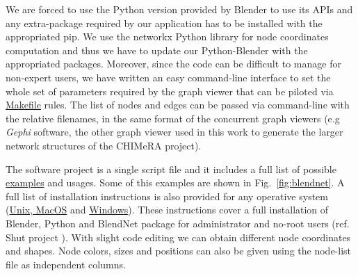 \documentclass{standalone}
\begin{document}
We are forced to use the \textsf{Python} version provided by \textsf{Blender} to use its APIs and any extra-package required by our application has to be installed with the appropriated \textsf{pip}.
We use the \textsf{networkx} \textsf{Python} library for node coordinates computation and thus we have to update our \textsf{Python}-\textsf{Blender} with the appropriated packages.
Moreover, since the code can be difficult to manage for non-expert users, we have written an easy command-line interface to set the whole set of parameters required by the graph viewer that can be piloted via \href{https://github.com/Nico-Curti/BlendNet/blob/master/Makefile}{\textsf{Makefile}} rules.
The list of nodes and edges can be passed via command-line with the relative filenames, in the same format of the concurrent graph viewers (e.g \emph{Gephi} software, the other graph viewer used in this work to generate the larger network structures of the \textsf{CHIMeRA} project).

The software project is a single script file and it includes a full list of possible \href{https://github.com/Nico-Curti/BlendNet/blob/master/example}{examples} and usages.
Some of this examples are shown in Fig.~\ref{fig:blendnet}.
A full list of installation instructions is also provided for any operative system (\href{https://github.com/Nico-Curti/BlendNet/blob/master/install.sh}{Unix, MacOS} and \href{https://github.com/Nico-Curti/BlendNet/blob/master/install.ps1}{Windows}).
These instructions cover a full installation of \textsf{Blender}, \textsf{Python} and \textsf{BlendNet} package for administrator and no-root users (ref. \textsf{Shut} project \cite{Shut}).
With slight code editing we can obtain different node coordinates and shapes.
Node colors, sizes and positions can also be given using the node-list file as independent columns.
\end{document}
